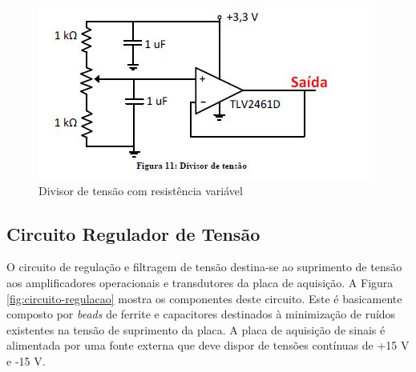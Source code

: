 \begin{figure}[!hbt]
	\begin{center}
		\includegraphics[scale=0.7]{figuras/divisor-tensao.JPG}
		\caption{Divisor de tensão com resistência variável}
		\label{fig:divisor-tensao}
	\end{center}
\end{figure}

\subsection{Circuito Regulador de Tensão}

O circuito de regulação e filtragem de tensão destina-se ao suprimento de tensão aos amplificadores operacionais e transdutores da placa de aquisição. A Figura \ref{fig:circuito-regulacao} mostra os componentes deste circuito. Este é basicamente composto por \textit{beads} de ferrite e capacitores destinados à minimização de ruídos existentes na tensão de suprimento da placa. A placa de aquisição de sinais é alimentada por uma fonte externa que deve dispor de tensões contínuas de +15 V e -15 V.

